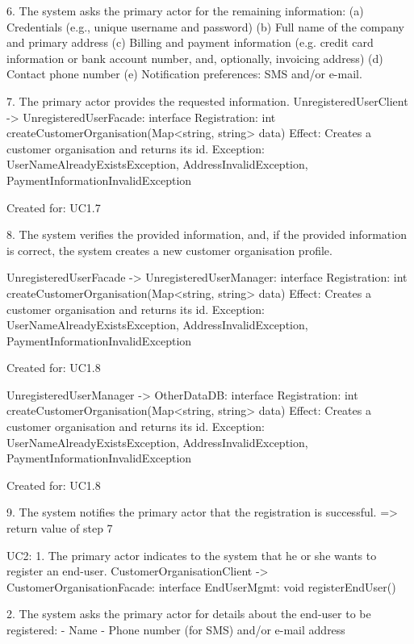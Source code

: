         6. The system asks the primary actor for the remaining information:
           (a) Credentials (e.g., unique username and password)
           (b) Full name of the company and primary address
           (c) Billing and payment information (e.g. credit card information or bank account number,
               and, optionally, invoicing address)
           (d) Contact phone number
           (e) Notification preferences: SMS and/or e-mail.

        7. The primary actor provides the requested information.
            UnregisteredUserClient -> UnregisteredUserFacade: interface Registration: int createCustomerOrganisation(Map<string, string> data)
                Effect: Creates a customer organisation and returns its id.
                Exception: UserNameAlreadyExistsException, AddressInvalidException, PaymentInformationInvalidException
                \item Created for: UC1.7

        8. The system verifies the provided information, and, if the provided information is correct, the
           system creates a new customer organisation profile.

            UnregisteredUserFacade -> UnregisteredUserManager: interface Registration: int createCustomerOrganisation(Map<string, string> data)
                Effect: Creates a customer organisation and returns its id.
                Exception: UserNameAlreadyExistsException, AddressInvalidException, PaymentInformationInvalidException
                \item Created for: UC1.8

            UnregisteredUserManager -> OtherDataDB: interface Registration: int createCustomerOrganisation(Map<string, string> data)
                Effect: Creates a customer organisation and returns its id.
                Exception: UserNameAlreadyExistsException, AddressInvalidException, PaymentInformationInvalidException
                \item Created for: UC1.8

        9. The system notifies the primary actor that the registration is successful.
            => return value of step 7


    UC2:
        1. The primary actor indicates to the system that he or she wants to register an end-user.
            CustomerOrganisationClient -> CustomerOrganisationFacade: interface EndUserMgmt: void registerEndUser()

        2. The system asks the primary actor for details about the end-user to be registered:
            - Name
            - Phone number (for SMS) and/or e-mail address

